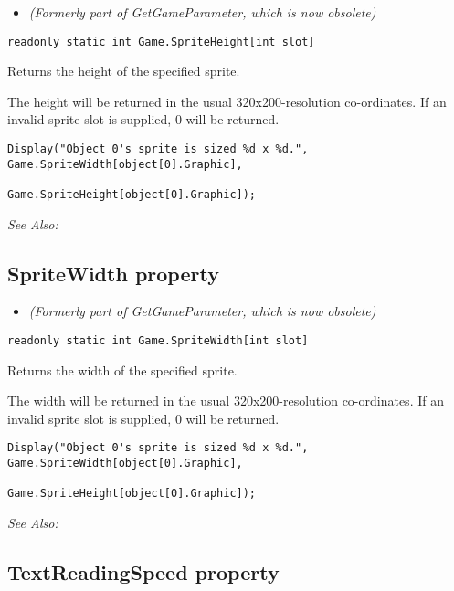 \begin{itemize}
\item \it{(Formerly part of GetGameParameter, which is now obsolete)}
\end{itemize}

\begin{verbatim}
readonly static int Game.SpriteHeight[int slot]
\end{verbatim}
Returns the height of the specified sprite.

The height will be returned in the usual 320x200-resolution co-ordinates. If an invalid
sprite slot is supplied, 0 will be returned.

\begin{verbatim}
Display("Object 0's sprite is sized %d x %d.", Game.SpriteWidth[object[0].Graphic],
                                               Game.SpriteHeight[object[0].Graphic]);
\end{verbatim}

\it{See Also:} 


\subsection{SpriteWidth property}\label{Game.SpriteWidth}%

\begin{itemize}
\item \it{(Formerly part of GetGameParameter, which is now obsolete)}
\end{itemize}

\begin{verbatim}
readonly static int Game.SpriteWidth[int slot]
\end{verbatim}
Returns the width of the specified sprite.

The width will be returned in the usual 320x200-resolution co-ordinates. If an invalid
sprite slot is supplied, 0 will be returned.

\begin{verbatim}
Display("Object 0's sprite is sized %d x %d.", Game.SpriteWidth[object[0].Graphic],
                                               Game.SpriteHeight[object[0].Graphic]);
\end{verbatim}

\it{See Also:} 


\subsection{TextReadingSpeed property}\label{Game.TextReadingSpeed}%

